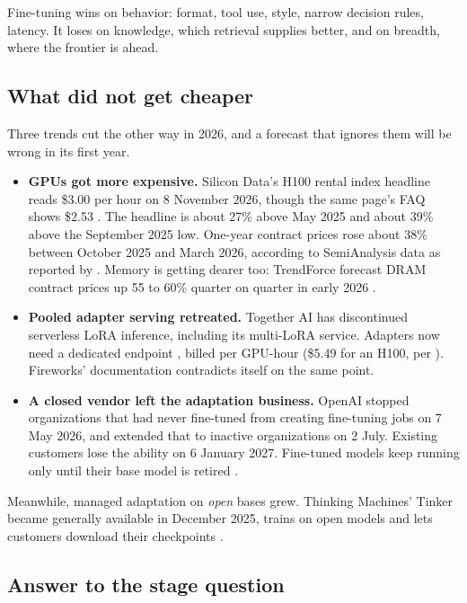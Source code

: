  Fine-tuning wins on behavior: format, tool use, style, narrow decision rules, latency. It loses on knowledge, which retrieval supplies better, and on breadth, where the frontier is ahead.

\subsection{What did not get cheaper}

Three trends cut the other way in 2026, and a forecast that ignores them will be wrong in its first year.

\begin{itemize}
\tightlist
\item
  \textbf{GPUs got more expensive.} Silicon Data's H100 rental index headline reads \$3.00 per hour on 8 November 2026, though the same page's FAQ shows \$2.53 \citep{silicondata2026h100}. The headline is about 27\% above May 2025 and about 39\% above the September 2025 low. One-year contract prices rose about 38\% between October 2025 and March 2026, according to SemiAnalysis data as reported by \citet{cryptobriefing2026}. Memory is getting dearer too: TrendForce forecast DRAM contract prices up 55 to 60\% quarter on quarter in early 2026 \citep{trendforce2026}.
\item
  \textbf{Pooled adapter serving retreated.} Together AI has discontinued serverless LoRA inference, including its multi-LoRA service. Adapters now need a dedicated endpoint \citep{together2026lora}, billed per GPU-hour (\$5.49 for an H100, per \citealp{together2026pricing}). Fireworks' documentation contradicts itself on the same point.
\item
  \textbf{A closed vendor left the adaptation business.} OpenAI stopped organizations that had never fine-tuned from creating fine-tuning jobs on 7 May 2026, and extended that to inactive organizations on 2 July. Existing customers lose the ability on 6 January 2027. Fine-tuned models keep running only until their base model is retired \citep{openai2026deprecations}.
\end{itemize}

Meanwhile, managed adaptation on \emph{open} bases grew. Thinking Machines' Tinker became generally available in December 2025, trains on open models and lets customers download their checkpoints \citep{tml2026tinker}.

\subsection{Answer to the stage question}

